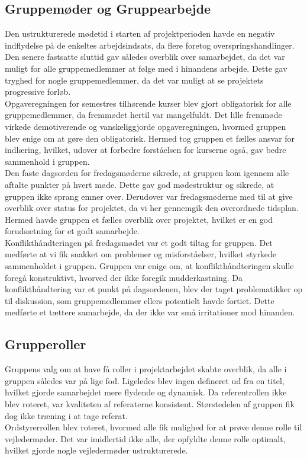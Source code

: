 \subsection{Gruppemøder og Gruppearbejde}
Den ustrukturerede mødetid i starten af projektperioden havde en negativ indflydelse på de enkeltes arbejdsindsats, da flere foretog overspringshandlinger. Den senere fastsatte sluttid gav således overblik over samarbejdet, da det var muligt for alle gruppemedlemmer at følge med i hinandens arbejde. Dette gav tryghed for nogle gruppemedlemmer, da det var muligt at se projektets progressive forløb. \\ %
Opgaveregningen for semestres tilhørende kurser blev gjort obligatorisk for alle gruppemedlemmer, da fremmødet hertil var mangelfuldt. Det lille fremmøde virkede demotiverende og vanskeliggjorde opgaveregningen, hvormed gruppen blev enige om at gøre den obligatorisk. Hermed tog gruppen et fælles ansvar for indlæring, hvilket, udover at forbedre forståelsen for kurserne også, gav bedre sammenhold i gruppen. \\ %
Den faste dagsorden for fredagsmøderne sikrede, at gruppen kom igennem alle aftalte punkter på hvert møde. Dette gav god mødestruktur og sikrede, at gruppen ikke sprang emner over. Derudover var fredagsmøderne med til at give overblik over status for projektet, da vi her gennemgik den overordnede tidsplan. Hermed havde gruppen et fælles overblik over projektet, hvilket er en god forudsætning for et godt samarbejde. \\
Konflikthåndteringen på fredagsmødet var et godt tiltag for gruppen. Det medførte at vi fik snakket om problemer og misforståelser, hvilket styrkede sammenholdet i gruppen. Gruppen var enige om, at konflikthåndteringen skulle foregå konstruktivt, hvorved der ikke foregik mudderkastning. Da konflikthåndtering var et punkt på dagsordenen, blev der taget problematikker op til diskussion, som gruppemedlemmer ellers potentielt havde fortiet. Dette medførte et tættere samarbejde, da der ikke var små irritationer mod hinanden.

\subsection{Grupperoller}
Gruppens valg om at have få roller i projektarbejdet skabte overblik, da alle i gruppen således var på lige fod. Ligeledes blev ingen defineret ud fra en titel, hvilket gjorde samarbejdet mere flydende og dynamisk. Da referentrollen ikke blev roteret, var kvaliteten af referaterne konsistent. Størstedelen af gruppen fik dog ikke træning i at tage referat. \\
Ordstyrerrollen blev roteret, hvormed alle fik mulighed for at prøve denne rolle til vejledermøder. Det var imidlertid ikke alle, der opfyldte denne rolle optimalt, hvilket gjorde nogle vejledermøder ustrukturerede. 

